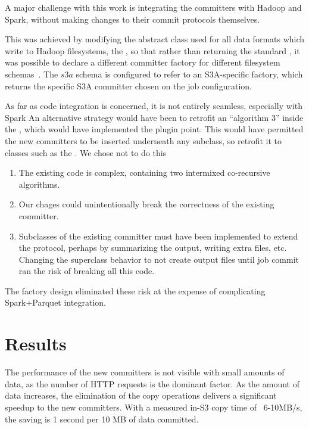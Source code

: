 \documentclass[9pt,technote]{IEEEtran}
\begin{document}
A major challenge with this work is integrating the committers with Hadoop
and Spark, without making changes to their commit protocols themselves.

This was achieved by modifying the abstract class used for all data formats
which write to Hadoop filesystems, the , so that rather than
returning the standard , it was possible to declare
a different committer factory for different filesystem schemas\ \cite{MAPREDUCE-6823}.
The $s3a$ schema is configured to refer to an S3A-specific factory, which
returns the specific S3A committer chosen on the job configuration.


As far as code integration is concerned, it is not entirely seamless, especially
with Spark
An alternative strategy would have been to retrofit an ``algorithm 3'' inside
the , which would have implemented the plugin point.
This would have permitted the new committers to be inserted underneath any
subclass, so retrofit it to classes such as the .
We chose not to do this
\begin{enumerate}
  \item The existing code is complex, containing two intermixed co-recursive
  algorithms.
  \item Our chages could unintentionally break the correctness of the existing committer.
  \item Subclasses of the existing committer must have been implemented to extend
  the protocol, perhaps by summarizing the output, writing extra files, etc.
  Changing the superclass behavior to not create output files until job commit
  ran the risk of breaking all this code.
\end{enumerate}
The factory design eliminated these risk at the expense of complicating
Spark+Parquet integration.

\section{Results}
\label{sec:results}


The performance of the new committers is not visible with small amounts
of data, as the number of HTTP requests is the dominant factor.
As the amount of data increases, the elimination of the copy operations
delivers a significant speedup to the new committers.
With a measured in-S3 copy time of ~6-10MB/s, the saving is 1 second per 10 MB
of data committed.
\end{document}
